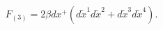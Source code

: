 \begin{equation}
\label{fluxppD1D5}
F_{(3)} = 2\beta dx^+ ( d\tilde{x}^1 d\tilde{x}^2 
+ d\tilde{x}^3 d\tilde{x}^4 ).
\end{equation}

